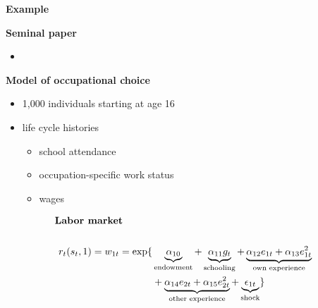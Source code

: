 \begin{frame}\begin{center}
\LARGE\textbf{Example}
\end{center}\end{frame}
\begin{frame}\textbf{Seminal paper}\vspace{0.3cm}
\begin{itemize}
\item {}
\end{itemize}
\end{frame}
\begin{frame}\textbf{Model of occupational choice}\vspace{0.3cm}

\begin{itemize}\setlength\itemsep{1em}
\item 1,000 individuals starting at age 16
\item life cycle histories \medskip
\begin{itemize}\setlength\itemsep{1em}
\item school attendance
\item occupation-specific work status
\item wages
\end{itemize}
\end{itemize}
\end{frame}
\begin{frame}

  \begin{align*}
  \text{\textbf{Labor market}}\qquad\quad & \\
  & \\
  r_t(s_t, 1) =  w_{1t} = \exp\{& \underbrace{\alpha_{10}}_{\text{endowment}} + \underbrace{\alpha_{11} g_t}_{\text{schooling}} + \underbrace{\alpha_{12}e_{1t} + \alpha_{13}e^2_{1t}}_{\text{own experience}} \\
              & + \underbrace{\alpha_{14}e_{2t} + \alpha_{15}e^2_{2t}}_{\text{other experience}} + \underbrace{\epsilon_{1t}}_{\text{shock}}\}
  \end{align*}
  \end{frame}
